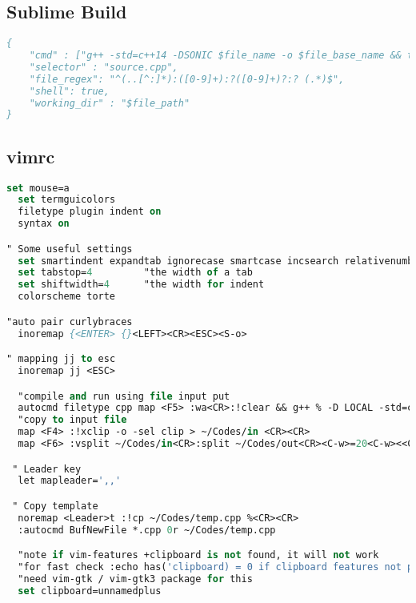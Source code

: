 \subsection*{Sublime Build}
\begin{lstlisting}[language= Pascal, commentstyle=\color{black}, numberstyle=\tiny\color{black}, keywordstyle=\color{black}, stringstyle=\color{black},
]
{
    "cmd" : ["g++ -std=c++14 -DSONIC $file_name -o $file_base_name && timeout 4s ./$file_base_name<inputf.in>outputf.in"], 
    "selector" : "source.cpp",
    "file_regex": "^(..[^:]*):([0-9]+):?([0-9]+)?:? (.*)$",
    "shell": true,
    "working_dir" : "$file_path"
}
\end{lstlisting}
\subsection*{vimrc}

\begin{lstlisting}[language= Pascal, commentstyle=\color{black}, numberstyle=\tiny\color{black}, keywordstyle=\color{black}, stringstyle=\color{black},
]
set mouse=a
  set termguicolors
  filetype plugin indent on
  syntax on

" Some useful settings
  set smartindent expandtab ignorecase smartcase incsearch relativenumber nowrap autoread splitright splitbelow
  set tabstop=4         "the width of a tab
  set shiftwidth=4      "the width for indent
  colorscheme torte

"auto pair curlybraces
  inoremap {<ENTER> {}<LEFT><CR><ESC><S-o>

" mapping jj to esc
  inoremap jj <ESC>  

  "compile and run using file input put  
  autocmd filetype cpp map <F5> :wa<CR>:!clear && g++ % -D LOCAL -std=c++17 -Wall -Wextra -Wconversion -Wshadow -Wfloat-equal -o  ~/Codes/prog && (timeout 5 ~/Codes/prog < ~/Codes/in) >  ~/Codes/out<CR>
  "copy to input file
  map <F4> :!xclip -o -sel clip > ~/Codes/in <CR><CR>
  map <F6> :vsplit ~/Codes/in<CR>:split ~/Codes/out<CR><C-w>=20<C-w><<C-w><C-h>

 " Leader key
  let mapleader=',,'

 " Copy template
  noremap <Leader>t :!cp ~/Codes/temp.cpp %<CR><CR>
  :autocmd BufNewFile *.cpp 0r ~/Codes/temp.cpp

  "note if vim-features +clipboard is not found, it will not work
  "for fast check :echo has('clipboard) = 0 if clipboard features not present,
  "need vim-gtk / vim-gtk3 package for this
  set clipboard=unnamedplus
\end{lstlisting}
